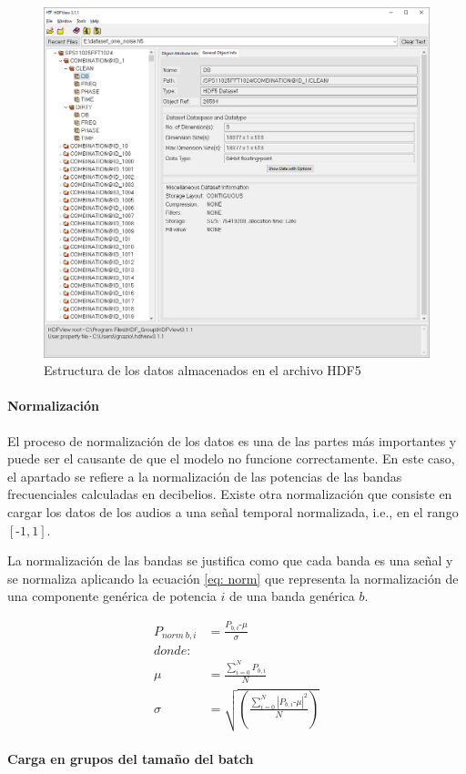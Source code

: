 \begin{figure}[h!]
	\centering
	\includegraphics[width=0.9\columnwidth]{figures/HDF5_struct2}
	\caption{Estructura de los datos almacenados en el archivo \gls{HDF5}}
	\label{fig: hdf5_struct2}
\end{figure}

\paragraph{Normalización}

El proceso de normalización de los datos es una de las partes más importantes y puede ser el causante de que el modelo no funcione correctamente. En este caso, el apartado se refiere a la normalización de las potencias de las bandas frecuenciales calculadas en decibelios. Existe otra normalización que consiste en cargar los datos de los audios a una señal temporal normalizada, i.e., en el rango $\left[\text{-}1,1\right]$.

La normalización de las bandas se justifica como que cada banda es una señal y se normaliza aplicando la ecuación \ref{eq: norm} que representa la normalización de una componente genérica de potencia $i$ de una banda genérica $b$.

\begin{align}
\nonumber
P_{norm~b,i} &= \frac{P_{b,i} \text{-}\mu}{\sigma} \\ \nonumber
donde: \\ \nonumber
\mu&=\frac{\sum_{i=0}^{N}P_{b, i}}{N} \\ \nonumber
\sigma &= \sqrt{ \left( \frac{\sum_{i=0}^{N}{ {\left| P_{b, i} \text{-} \mu \right|}^2}}{N} \right) }
\end{align}
\label{eq: norm}

\paragraph{Carga en grupos del tamaño del batch}
